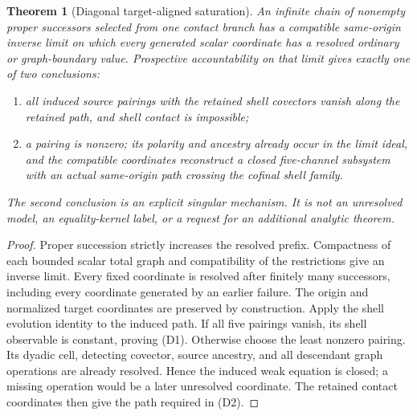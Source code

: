 \documentclass[11pt]{article}
\numberwithin{section}{part}
\theoremstyle{plain}
\newtheorem{theorem}{Theorem}[section]
\theoremstyle{definition}
\theoremstyle{remark}
\begin{document}
\begin{theorem}[Diagonal target-aligned saturation]
\label{thm:diagonal-target-aligned-saturation}
An infinite chain of nonempty proper successors selected from one contact
branch has a compatible same-origin inverse
limit on which every generated scalar coordinate has a resolved ordinary or
graph-boundary value.  Prospective accountability on that limit gives
exactly one of two conclusions:
\begin{enumerate}[label=\textup{(D\arabic*)}]
\item all induced source pairings with the retained shell covectors vanish
along the retained path, and shell contact is impossible;
\item a pairing is nonzero; its polarity and ancestry already occur in the
limit ideal, and the compatible coordinates reconstruct a closed
five-channel subsystem with an actual same-origin path crossing the cofinal
shell family.
\end{enumerate}
The second conclusion is an explicit singular mechanism.  It is not an
unresolved model, an equality-kernel label, or a request for an additional
analytic theorem.
\end{theorem}

\begin{proof}
Proper succession strictly increases the resolved prefix.  Compactness of
each bounded scalar total graph and compatibility of the restrictions give
an inverse limit.  Every fixed coordinate is resolved after finitely many
successors, including every coordinate generated by an earlier failure.
The origin and normalized target coordinates are preserved by construction.
Apply the shell evolution identity to the induced path.  If all five
pairings vanish, its shell observable is constant, proving \textup{(D1)}.
Otherwise choose the least nonzero pairing.  Its dyadic cell, detecting
covector, source ancestry, and all descendant graph operations are already
resolved.  Hence the induced weak equation is closed; a missing operation
would be a later unresolved coordinate.  The retained contact coordinates
then give the path required in \textup{(D2)}.
\end{proof}
\end{document}
